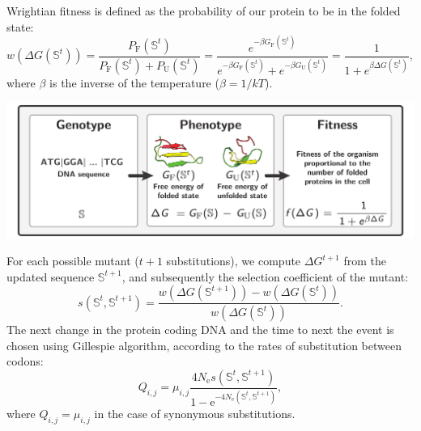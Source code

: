 \documentclass{article}
\newcommand{\e}{\mathrm{e}}
\newcommand{\Ne}{N_{\mathrm{e}}}
\newcommand{\ci}{{i}}
\newcommand{\cj}{{j}}
\newcommand{\itoj}{\ci, \cj}
\newcommand{\submatrix}{Q}
\newcommand{\phenoFold}{\Delta G}
\begin{document}
Wrightian fitness is defined as the probability of our protein to be in the folded state: 
\begin{equation}
w(\phenoFold\left(\mathbb{S}^{t}\right)) = \dfrac{P_{\mathrm{F}}\left(\mathbb{S}^{t}\right)}{P_{\mathrm{F}}\left(\mathbb{S}^{t}\right) + P_{\mathrm{U}}\left(\mathbb{S}^{t}\right)} = \dfrac{e^{-\beta G_{\mathrm{F}}\left(\mathbb{S}^{t}\right) }}{e^{-\beta G_{\mathrm{F}} \left(\mathbb{S}^{t}\right) } + e^{-\beta G_{\mathrm{U}}\left(\mathbb{S}^{t}\right) }} = \dfrac{1}{1 + e^{\beta \phenoFold\left(\mathbb{S}^{t}\right) }}, 
\end{equation}
where $\beta$ is the inverse of the temperature ($\beta=1/kT$).
\begin{center}
	\includegraphics[width=165mm] {artworks/ModelSimuFold.pdf}
\end{center}
For each possible mutant ($t+1$ substitutions), we compute $\phenoFold^{t+1}$ from the updated sequence $\mathbb{S}^{t+1}$, and subsequently the selection coefficient of the mutant:
\begin{equation}
s \left( \mathbb{S}^{t},\mathbb{S}^{t+1}\right) = \dfrac{ w\left( \phenoFold\left(\mathbb{S}^{t+1}\right) \right) - w\left( \phenoFold\left(\mathbb{S}^{t}\right) \right)}{w\left( \phenoFold\left(\mathbb{S}^{t}\right) \right)}.
\end{equation}
The next change in the protein coding DNA and the time to next the event is chosen using Gillespie algorithm, according to the rates of substitution between codons:
\begin{equation}
{\submatrix_{\itoj}} = \mu_{\itoj} \dfrac{4 \Ne s \left( \mathbb{S}^{t},\mathbb{S}^{t+1}\right)}{{1 - \e^{-4 \Ne \left( \mathbb{S}^{t},\mathbb{S}^{t+1}\right)} }}, 
\end{equation}
where ${\submatrix_{\itoj}} = \mu_{\itoj}$ in the case of synonymous substitutions.
\end{document}
